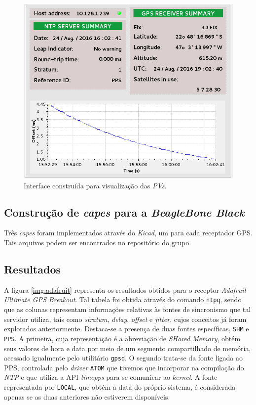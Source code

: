\begin{figure}[h]
    
    \centering
    \includegraphics[scale=0.5]{image/epics-opi-ntpgps}
    \caption {Interface construída para visualização das
    \textit{PVs}.}
    \label{img:ntp-opi} 
\end{figure} 

 
\subsection{Construção de \textit{capes} para a \textit{BeagleBone Black}}

Três \textit{capes} foram implementados através do \textit{Kicad}, um para cada
receptador GPS. Tais arquivos podem ser encontrados no repositório do grupo.

\subsection{Resultados}

A figura \ref{img:adafruit} representa os resultados obtidos para o receptor
\textit{Adafruit Ultimate GPS Breakout}. Tal tabela foi obtida através do
comando \texttt{ntpq}, sendo que as colunas representam informações relativas às fontes de sincronismo que
tal servidor utiliza, tais como \textit{stratum}, \textit{delay},
\textit{offset} e \textit{jitter}, cujos conceitos já foram explorados
anteriormente. Destaca-se a presença de duas fontes específicas, \texttt{SHM} e
\texttt{PPS}. A primeira, cuja representação é a abreviação de \textit{SHared
Memory}, obtém seus valores de hora e data por meio de um segmento compartilhado de memória,
acessado igualmente pelo utilitário \texttt{gpsd}. O segundo trata-se da fonte
ligada ao PPS, controlada pelo \textit{driver} \texttt{ATOM} que tivemos que
incorporar na compilação do \textit{NTP} e que utiliza a API \textit{timepps}
para se comunicar ao \textit{kernel}. A fonte representada por \texttt{LOCAL},
que obtém a data do próprio sistema, é considerada apenas se as duas anteriores
não estiverem disponíveis.

